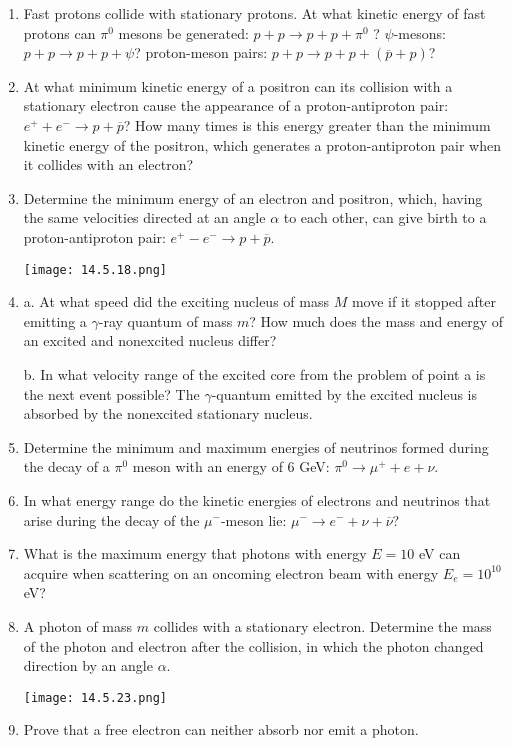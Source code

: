 \documentclass{article}
\begin{document}
\begin{enumerate}[label=14.5.\arabic*]
\item Fast protons collide with stationary protons. At what kinetic energy of fast protons can $\pi^0$ mesons be generated: $p + p \to p + p + \pi^0$ ? $\psi$-mesons: $p + p \to p + p + \psi$? proton-meson pairs: $p + p \to p + p + (\overline{p} + p)$?

\item At what minimum kinetic energy of a positron can its collision with a stationary electron cause the appearance of a proton-antiproton pair: $e^+ + e^- \to p + \overline{p}$? How many times is this energy greater than the minimum kinetic energy of the positron, which generates a proton-antiproton pair when it collides with an electron?

\item Determine the minimum energy of an electron and positron, which, having the same velocities directed at an angle $\alpha$ to each other, can give birth to a proton-antiproton pair: $e^+ - e^- \to p + \overline{p}$.

\begin{center}
    \texttt{[image: 14.5.18.png]}
\end{center}


\item a. At what speed did the exciting nucleus of mass $M$ move if it stopped after emitting a $\gamma$-ray quantum of mass $m$? How much does the mass and energy of an excited and nonexcited nucleus differ? 

b. In what velocity range of the excited core from the problem of point a is the next event possible? The $\gamma$-quantum emitted by the excited nucleus is absorbed by the nonexcited stationary nucleus.

\item Determine the minimum and maximum energies of neutrinos formed during the decay of a $\pi^0$ meson with an energy of $6$ GeV: $\pi^0 \to \mu^+ + e + \nu$.

\item In what energy range do the kinetic energies of electrons and neutrinos that arise during the decay of the $\mu^-$-meson lie: $\mu^- \to e^- + \nu + \overline{\nu}$?

\item What is the maximum energy that photons with energy $E = 10$ eV can acquire when scattering on an oncoming electron beam with energy $E_e = 10^{10}$ eV?

\item A photon of mass $m$ collides with a stationary electron. Determine the mass of the photon and electron after the collision, in which the photon changed direction by an angle $\alpha$.

\begin{center}
    \texttt{[image: 14.5.23.png]}
\end{center}


\item Prove that a free electron can neither absorb nor emit a photon.




\end{enumerate}
\end{document}
